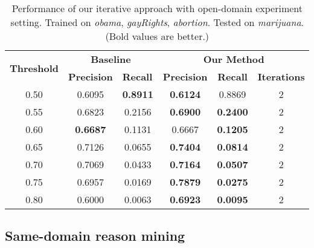 \documentclass[11pt,a4paper]{article}
\begin{document}
\begin{table*}[h]
\begin{center}
\begin{tabular}{|c||c|c|c|c|c|}
\hline
\multicolumn{1}{|c|}{\multirow{2}{*}{\bf Threshold}} & \multicolumn{2}{c|}{\bf Baseline}  & \multicolumn{3}{c|}{\bf Our Method}    \\ \cline{2-6} 
\multicolumn{1}{|c|}{}   & \multicolumn{1}{l|}{\bf Precision} & \multicolumn{1}{l|}{\bf Recall} & \multicolumn{1}{l|}{\bf Precision} & \multicolumn{1}{c|}{\bf Recall} & \multicolumn{1}{l|}{\bf Iterations} \\ \hline
 \hline
0.50 & 0.6095 &\bf 0.8911 &\bf 0.6124 & 0.8869 & 2 \\
0.55 & 0.6823 & 0.2156 &\bf 0.6900 &\bf 0.2400 & 2 \\
0.60 &\bf 0.6687 & 0.1131 & 0.6667 &\bf 0.1205 & 2 \\
0.65 & 0.7126 & 0.0655 &\bf 0.7404 &\bf 0.0814 & 2 \\
0.70 & 0.7069 & 0.0433 &\bf 0.7164 &\bf 0.0507 & 2 \\
0.75 & 0.6957 & 0.0169 &\bf 0.7879 &\bf 0.0275 & 2 \\
0.80 & 0.6000 & 0.0063 &\bf 0.6923 &\bf 0.0095 & 2
\\\hline
\end{tabular}
\end{center}
\caption{\label{tab:cross-marijuana} Performance of our iterative approach with open-domain experiment setting. Trained on {\it obama}, {\it gayRights}, {\it abortion}. Tested on {\it marijuana}. (Bold values are better.)}
\end{table*}


\subsection{Same-domain reason mining}
\end{document}
